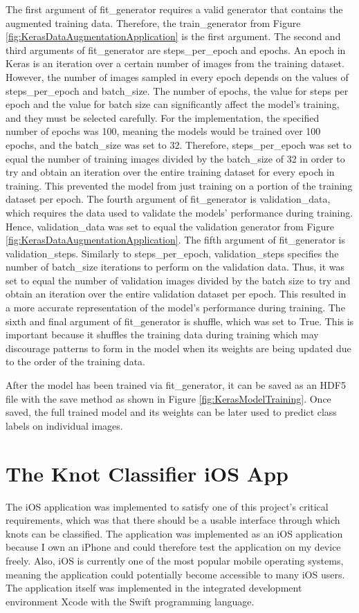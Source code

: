 \documentclass{l4proj}
\begin{document}
The first argument of fit\_generator requires a valid generator that contains the augmented training data.
Therefore, the train\_generator from Figure \ref{fig:KerasDataAugmentationApplication} is the first argument.
The second and third arguments of fit\_generator are steps\_per\_epoch and epochs.
An epoch in Keras is an iteration over a certain number of images from the training dataset.
However, the number of images sampled in every epoch depends on the values of steps\_per\_epoch and batch\_size.
The number of epochs, the value for steps per epoch and the value for batch size can significantly affect the model's training, and they must be selected carefully.
For the implementation, the specified number of epochs was 100, meaning the models would be trained over 100 epochs, and the batch\_size was set to 32.
Therefore, steps\_per\_epoch was set to equal the number of training images divided by the batch\_size of 32 in order to try and obtain an iteration over the entire training dataset for every epoch in training.
This prevented the model from just training on a portion of the training dataset per epoch.
The fourth argument of fit\_generator is validation\_data, which requires the data used to validate the models' performance during training.
Hence, validation\_data was set to equal the validation generator from Figure \ref{fig:KerasDataAugmentationApplication}.
The fifth argument of fit\_generator is validation\_steps.
Similarly to steps\_per\_epoch, validation\_steps specifies the number of batch\_size iterations to perform on the validation data.
Thus, it was set to equal the number of validation images divided by the batch size to try and obtain an iteration over the entire validation dataset per epoch.
This resulted in a more accurate representation of the model's performance during training.
The sixth and final argument of fit\_generator is shuffle, which was set to True.
This is important because it shuffles the training data during training which may discourage patterns to form in the model when its weights are being updated due to the order of the training data.

After the model has been trained via fit\_generator, it can be saved as an HDF5 file with the save method as shown in Figure \ref{fig:KerasModelTraining}.
Once saved, the full trained model and its weights can be later used to predict class labels on individual images. 


\section{The Knot Classifier iOS App}
The iOS application was implemented to satisfy one of this project's critical requirements, which was that there should be a usable interface through which knots can be classified.
The application was implemented as an iOS application because I own an iPhone and could therefore test the application on my device freely. Also, iOS is currently one of the most popular mobile operating systems, meaning the application could potentially become accessible to many iOS users.
The application itself was implemented in the integrated development environment Xcode with the Swift programming language.
\end{document}
